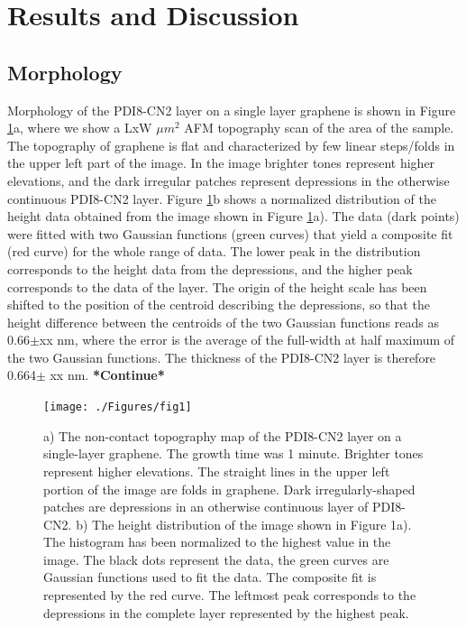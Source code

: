 \documentclass[preprint,aip,jap]{revtex4-2}
\begin{document}
\section{\label{sec:res}Results and Discussion}

\subsection{\label{sec:morph}Morphology}

Morphology of the PDI8-CN2 layer on a single layer graphene is shown in Figure \ref{fig:1}a, where we show a LxW $\mu m^2$ AFM topography scan of the area of the sample. The topography of graphene is flat and characterized by few linear steps/folds in the upper left part of the image. In the image brighter tones represent higher elevations, and the dark irregular patches represent depressions in the otherwise continuous PDI8-CN2 layer. Figure \ref{fig:1}b  shows a normalized distribution of the height data obtained from the image shown in Figure \ref{fig:1}a). The data (dark points) were fitted with two Gaussian functions (green curves) that yield a composite fit (red curve) for the whole range of data. The lower peak in the distribution corresponds to the height data from the depressions, and the higher peak corresponds to the data of the layer. The origin of the height scale has been shifted to the position of the centroid describing the depressions, so that the height difference between the centroids of the two Gaussian functions reads as 0.66$\pm$xx nm, where the error is the average of the full-width at half maximum of the two Gaussian functions.  The thickness of the PDI8-CN2 layer is therefore 0.664$\pm$ xx nm.\textbf{ *Continue*}
\begin{figure}[htb]
  \centering
        \texttt{[image: ./Figures/fig1]}
  \caption{a) The non-contact topography map of the PDI8-CN2 layer on a single-layer graphene. The growth time was 1 minute. Brighter tones represent higher elevations. The straight lines in the upper left portion of the image are folds in graphene. Dark irregularly-shaped patches are depressions in an otherwise continuous layer of PDI8-CN2.  b) The height distribution of the image shown in Figure 1a). The histogram has been normalized to the highest value in the image. The black dots represent the data, the green curves are Gaussian functions used to fit the data. The composite fit is represented by the red curve. The leftmost peak corresponds to the depressions in the complete layer represented by the highest peak.}
  \label{fig:1}
\end{figure}
\end{document}
